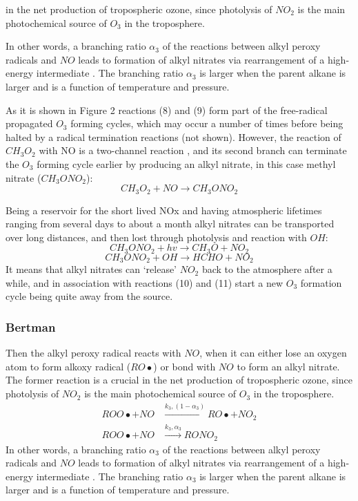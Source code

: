 \documentclass[11pt,a4paper]{article}
\begin{document}
in the net production of tropospheric ozone, since photolysis of $NO_2$ is the main photochemical source of $O_3$ in the troposphere.

In other words, a branching ratio $\alpha_3$ of the reactions between alkyl peroxy radicals and $NO$ leads to formation of alkyl nitrates via rearrangement of a high-energy intermediate \citep{Bertman1995}. The branching ratio $\alpha_3$ is larger when the parent alkane is larger and is a function of temperature and pressure.

As it is shown in Figure 2 reactions (8) and (9) form part of the free-radical propagated $O_3$ forming cycles, which may occur a number of times before being halted by a radical termination reactions (not shown). However, the reaction of $CH_3O_2$ with NO is a two-channel reaction \citep{Day2003}, and its second branch can terminate the $O_3$ forming cycle earlier by producing an alkyl nitrate, in this case methyl nitrate ($CH_3ONO_2$):
\begin{equation} \label{eq:CH3NO3form}
CH_3O_2 + NO \rightarrow CH_3ONO_2
\end{equation}

Being a reservoir for the short lived NOx and having atmospheric lifetimes ranging from several days to about a month \citep{Reeves2007} alkyl nitrates can be transported over long distances, and then lost through photolysis and reaction with $OH$:
\begin{equation} \label{eq:CH3NO3+hv}
CH_3ONO_2 + hv \rightarrow CH_3O + NO_2
\end{equation}
\begin{equation} \label{eq:CH3NO3+OH}
CH_3ONO_2 + OH \rightarrow HCHO + NO_2
\end{equation}
It means that alkyl nitrates can ‘release’ $NO_2$ back to the atmosphere after a while, and in association with reactions (10) and (11) start a new $O_3$ formation cycle being quite away from the source.

\subsubsection*{Bertman}
Then the alkyl peroxy radical reacts with $NO$, when it can either lose an oxygen atom to form alkoxy radical ($RO\bullet$) or bond with $NO$ to form an alkyl nitrate. The former reaction is a crucial in the net production of tropospheric ozone, since photolysis of $NO_2$ is the main photochemical source of $O_3$ in the troposphere.
\begin{subequations} \label{eq:peroxy_no0}
\begin{align}
ROO\bullet + NO &\xrightarrow{k_3, (1-\alpha_3)} RO\bullet + NO_2 \label{eq:peroxy_no1}\\
ROO\bullet + NO &\xrightarrow{k_3, \alpha_3} RONO_2 \label{eq:peroxy_no2}
\end{align}
\end{subequations}
In other words, a branching ratio $\alpha_3$ of the reactions between alkyl peroxy radicals and $NO$ leads to formation of alkyl nitrates via rearrangement of a high-energy intermediate \citep{Bertman1995}. The branching ratio $\alpha_3$ is larger when the parent alkane is larger and is a function of temperature and pressure.
\end{document}
